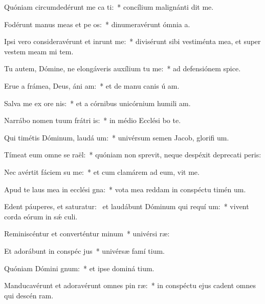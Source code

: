\item Quóniam circumdedérunt me ca ti:~* concílium malignánti dit me.
\item Fodérunt manus meas et pe os:~* dinumeravérunt ómnia  a.
\item Ipsi vero consideravérunt et inrunt me:~* divisérunt sibi vestiménta mea, et super vestem meam mi tem.
\item Tu autem, Dómine, ne elongáveris auxílium tu  me:~* ad defensiónem  spice.
\item Erue a frámea, Deus, áni am:~* et de manu canis ú am.
\item Salva me ex ore nis:~* et a córnibus unicórnium humili am.
\item Narrábo nomen tuum frátri is:~* in médio Ecclési bo te.
\item Qui timétis Dóminum, laudá um:~* univérsum semen Jacob, glorifi um.
\item Tímeat eum omne se raël:~* quóniam non sprevit, neque despéxit deprecati peris:
\item Nec avértit fáciem su  me:~* et cum clamárem ad eum, vit me.
\item Apud te laus mea in ecclési gna:~* vota mea reddam in conspéctu timén um.
\item Edent páuperes, et saturatur:~\pscross{} et laudábunt Dóminum qui requí um:~* vivent corda eórum in sǽ culi.
\item Reminiscéntur et converténtur  minum~* univérsi  ræ:
\item Et adorábunt in conspéc jus~* univérsæ famí tium.
\item Quóniam Dómini  gnum:~* et ipse dominá tium.
\item Manducavérunt et adoravérunt omnes pin ræ:~* in conspéctu ejus cadent omnes qui descén  ram.
